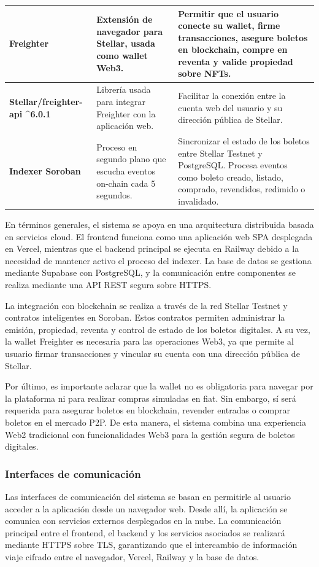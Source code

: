 \documentclass[12pt,letterpaper]{article}
\begin{document}
\begin{table}[htbp]
\begin{tabularx}{\textwidth}{|p{3.5cm}|X|X|}
\textbf{Freighter} &
Extensión de navegador para Stellar, usada como wallet Web3. &
Permitir que el usuario conecte su wallet, firme transacciones, asegure boletos en blockchain, compre en reventa y valide propiedad sobre NFTs. \\ \hline

\textbf{Stellar/freighter-api \textasciicircum 6.0.1} &
Librería usada para integrar Freighter con la aplicación web. &
Facilitar la conexión entre la cuenta web del usuario y su dirección pública de Stellar. \\ \hline

\textbf{Indexer Soroban} &
Proceso en segundo plano que escucha eventos on-chain cada 5 segundos. &
Sincronizar el estado de los boletos entre Stellar Testnet y PostgreSQL. Procesa eventos como boleto creado, listado, comprado, revendidos, redimido o invalidado. \\ \hline

\end{tabularx}
\normalsize
\end{table}
\FloatBarrier

En términos generales, el sistema se apoya en una arquitectura distribuida basada en servicios cloud. El frontend funciona como una aplicación web SPA desplegada en Vercel, mientras que el backend principal se ejecuta en Railway debido a la necesidad de mantener activo el proceso del indexer. La base de datos se gestiona mediante Supabase con PostgreSQL, y la comunicación entre componentes se realiza mediante una API REST segura sobre HTTPS.

La integración con blockchain se realiza a través de la red Stellar Testnet y contratos inteligentes en Soroban. Estos contratos permiten administrar la emisión, propiedad, reventa y control de estado de los boletos digitales. A su vez, la wallet Freighter es necesaria para las operaciones Web3, ya que permite al usuario firmar transacciones y vincular su cuenta con una dirección pública de Stellar.

Por último, es importante aclarar que la wallet no es obligatoria para navegar por la plataforma ni para realizar compras simuladas en fiat. Sin embargo, sí será requerida para asegurar boletos en blockchain, revender entradas o comprar boletos en el mercado P2P. De esta manera, el sistema combina una experiencia Web2 tradicional con funcionalidades Web3 para la gestión segura de boletos digitales.

\subsubsection{Interfaces de comunicación}
Las interfaces de comunicación del sistema se basan en permitirle al usuario
acceder a la aplicación desde un navegador web. Desde allí, la aplicación se
comunica con servicios externos desplegados en la nube. La comunicación
principal entre el frontend, el backend y los servicios asociados se realizará
mediante HTTPS sobre TLS, garantizando que el intercambio de información viaje
cifrado entre el navegador, Vercel, Railway y la base de datos.
\end{document}

